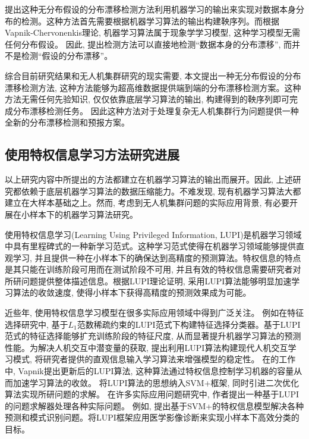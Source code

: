 \citet{Vovk1993}提出这种无分布假设的分布漂移检测方法利用机器学习的输出来实现对数据本身分布的检测。这种方法首先需要根据机器学习算法的输出构建鞅序列。而根据Vapnik-Chervonenkis理论, 机器学习算法属于现象学学习模型, 这种学习模型无需任何分布假设。 因此, \citet{Vovk1993}提出检测方法可以直接地检测“数据本身的分布漂移”, 而并不是检测“假设的分布漂移”。

综合目前研究结果和无人机集群研究的现实需要, 本文提出一种无分布假设的分布漂移检测方法, 这种方法能够为超高维数据提供端到端的分布漂移检测方案。这种方法无需任何先验知识, 仅仅依靠底层学习算法的输出, 构建得到的鞅序列即可完成分布漂移检测任务。 因此这种方法对于处理复杂无人机集群行为问题提供一种全新的分布漂移检测和预报方案。


\subsection{使用特权信息学习方法研究进展}

以上研究内容中所提出的方法都建立在机器学习算法的输出而展开。因此, 上述研究都依赖于底层机器学习算法的数据压缩能力。不难发现, 现有机器学习算法大都建立在大样本基础之上。然而, 考虑到无人机集群问题的实际应用背景, 有必要开展在小样本下的机器学习算法研究。

使用特权信息学习(Learning Using Privileged Information, LUPI)是机器学习领域中具有里程碑式的一种新学习范式\citep{Vapnik2009}。这种学习范式使得在机器学习领域能够提供直观学习\citep{Lerner1972,Ewald1996-1,Ewald1996-2}, 并且提供一种在小样本下的确保达到高精度的预测算法。特权信息的特点是其只能在训练阶段可用而在测试阶段不可用, 并且有效的特权信息需要研究者对所研问题提供整体描述信息\citep{Vapnik2006}。根据LUPI理论证明, 采用LUPI算法能够明显加速学习算法的收敛速度, 使得小样本下获得高精度的预测效果成为可能\citep{Pechyony2010}。

近些年, 使用特权信息学习模型在很多实际应用领域中得到广泛关注。 例如在特征选择研究中, \citet{Izmailov2018}基于$L_{1}$范数稀疏约束的LUPI范式下构建特征选择分类器。基于LUPI范式的特征选择能够扩充训练阶段的特征尺度, 从而显著提升机器学习算法的预测性能。为解决人机交互中潜变量的获取, \citet{Vrigkas2017}提出利用LUPI算法构建现代人机交互学习模式, 将研究者提供的直观信息输入学习算法来增强模型的稳定性。 在\citet{Vapnik-similary-2015}的工作中, Vapnik提出更新后的LUPI算法, 这种算法通过特权信息控制学习机器的容量从而加速学习算法的收敛。 \citet{Lapin2014}将LUPI算法的思想纳入SVM+框架, 同时引进二次优化算法实现所研问题的求解。 在许多实际应用问题研究中, 作者提出一种基于LUPI的问题求解器处理各种实际问题。 例如, \citet{Li2016}提出基于SVM+的特权信息模型解决各种预测和模式识别问题。\citet{Zheng2017}将LUPI框架应用医学影像诊断来实现小样本下高效分类的目标。

